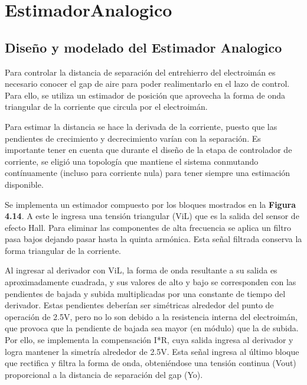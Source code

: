 \chapter{EstimadorAnalogico}  \label{cap:Estimador Analogico}

\section{Diseño y modelado del Estimador Analogico}

\noindent Para controlar la distancia de separaci\'{o}n del entrehierro del electroim\'{a}n es necesario conocer el gap de aire para poder realimentarlo en el lazo de control.  Para ello, se utiliza un estimador de posici\'{o}n que aprovecha la forma de onda triangular de la corriente que circula por el electroim\'{a}n. 

\noindent 

\noindent Para estimar la distancia se hace la derivada de la corriente, puesto que las pendientes de crecimiento y decrecimiento var\'{i}an con la separaci\'{o}n. Es importante tener en cuenta que durante el dise\~{n}o de la etapa de controlador de corriente, se eligi\'{o} una topolog\'{i}a que mantiene el sistema conmutando cont\'{i}nuamente (incluso para corriente nula) para tener siempre una estimaci\'{o}n disponible.

\noindent 

\noindent Se implementa un estimador compuesto por los bloques mostrados en la \textbf{Figura 4.14}. A este le ingresa una tensi\'{o}n triangular (ViL) que es la salida del sensor de efecto Hall. Para eliminar las componentes de alta frecuencia se aplica un filtro pasa bajos dejando pasar hasta la quinta arm\'{o}nica. Esta se\~{n}al filtrada conserva la forma triangular de la corriente. 

\noindent 

\noindent Al ingresar al derivador con ViL, la forma de onda resultante a su salida es aproximadamente cuadrada, y sus valores de alto y bajo se corresponden con las pendientes de bajada y subida multiplicadas por una constante de tiempo del derivador. Estas pendientes deber\'{i}an ser sim\'{e}tricas alrededor del punto de operaci\'{o}n de 2.5V, pero no lo son debido a la resistencia interna del electroim\'{a}n, que provoca que la pendiente de bajada sea mayor (en m\'{o}dulo) que la de subida. Por ello, se implementa la compensaci\'{o}n I*R, cuya salida ingresa al derivador y logra mantener la simetr\'{i}a alrededor de 2.5V. Esta se\~{n}al ingresa al \'{u}ltimo bloque que rectifica y filtra la forma de onda, obteni\'{e}ndose una tensi\'{o}n continua (Vout) proporcional a la distancia de separaci\'{o}n del gap (Yo).

